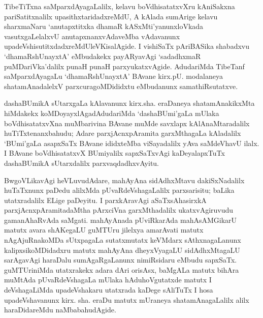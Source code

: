 TibeTiTxna saMparxdAyagaLalilx, kelavu boVdhisatatxvXru kAniSakxna pariSatitxnalilx upa\-sithxta\-ridadxreMdU, A kAlada sumArige kelavu sharxmaNaru `anutapxtitxka dhamaR kASxMti'yanunx\break loVkada vasutxgaLelalxvU anutapxnanxvAdaveMba vAdavanunx upadeVshisutitxdadxreMdU\break leVKisalAgide. I vishiSaTx pAriBASika shabadxvu `dhamaRshUnayxtA' eMbudakekx payARya\-vAgi `sadadhxmaR puMDariVka'dalilx punaH punaH parxyukatxvAgide. AdudariMda TibeTanf saMparxdAyagaLu `dhamaRshUnayxtA' BAvane kirx.pU. modalaneya shatamAnadalelxV parxcuragoMDididxtu eMbudanunx samathiRsutatxve.

dashaBUmikA sUtarxgaLa kAlavanunx kirx.sha. eraDaneya shatamAnakikxMta hiMdakekx koMDoyayxlAgadAdudariMda `dashaBUmi'gaLa mUlaka boVdhisatatxvXna muMbarivina BAvane muMde savxlapx kAlAnaMtaradalilx huTiTxtenanxbahudu; Adare parxjAcnxpAramita garxMthagaLa kAladalilx `BUmi'gaLa asapxSaTx BAvane ididxteMba viSayadalilx yAva saMdeVhavU ilalx. I BAvane boVdhisatatxvX BUmiyalilx sapxSaTxvAgi kaDeyalapxTuTx dashaBUmikA sUtarxdalilx parxvaqdadhxvAyitu.

BwgoVLikavAgi heVLuvudAdare, mahAyAna sidAdhxMtavu dakiSxNadalilx huTaTxnunx paDedu alilxMda pUvaRdeVshagaLalilx parxsarisitu; baLika utatxradalilx ELige paDeyitu. I parxkAravAgi aSaTxsAhasirxkA parxjAcnxpAramitadaMtha pArxciVna garxMthadalilx ukatxvAgi\-ruvudu gamanAhaRvAda saMgati. mahAyAnada pUviRkarAda mahAsAMGikarU matutx avara shAKegaLU guMTUru jilelxya amarAvati matutx nAgAjuRnakoMDa sUtxpagaLa sutatxmutatx keVMdarx sAthxnagaLanunx kalipxsikoMDidadxru matutx mahAyAna dheyxVyagaLU sidAdhxMtagaLU sarAgavAgi haraDalu sumAgaRgaLanunx nimiRsidaru eMbudu sapxSaTx. guMTUriniMda utatxrakekx adara dAri orisAsx, baMgALa matutx bihAra muMtAda pUvaRdeVshagaLa mUlaka hAduhoVgutatxde matutx I deVshagaLiMda upadeVshakaru utatxrada kaDege sAliTuTx I hosa upadeVshavanunx kirx. sha. eraDu matutx mUraneya shatamAnagaLalilx alilx haraDidareMdu naMbabahudAgide.

\theendnotes
{}
